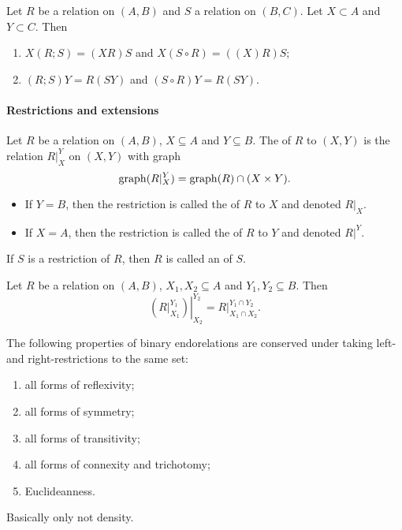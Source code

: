 \begin{lemma}
Let $R$ be a relation on $(A, B)$ and $S$ a relation on $(B, C)$. Let $X\subset A$ and $Y\subset C$. Then
\begin{enumerate}
\item $X(R;S) = (XR)S$ and $X(S\circ R) = ((X)R)S$;
\item $(R;S)Y = R(SY)$ and $(S\circ R)Y = R(SY)$.
\end{enumerate}
\end{lemma}

\paragraph{Restrictions and extensions}
\begin{definition}
Let $R$ be a relation on $(A, B)$, $X\subseteq A$ and $Y \subseteq B$. The  of $R$ to $(X,Y)$ is the relation $R|^Y_X$ on $(X,Y)$ with graph
\[ \operatorname{graph}(R|^Y_X) = \operatorname{graph}(R)\cap (X\times Y). \]
\begin{itemize}
\item If $Y = B$, then the restriction is called the  of $R$ to $X$ and denoted $\left.R\right|_X$.
\item If $X = A$, then the restriction is called the  of $R$ to $Y$ and denoted $\left.R\right|^Y$.
\end{itemize}
If $S$ is a restriction of $R$, then $R$ is called an  of $S$.
\end{definition}

\begin{lemma}
Let $R$ be a relation on $(A, B)$, $X_1,X_2\subseteq A$ and $Y_1,Y_2 \subseteq B$. Then
\[ \left.\left(R|_{X_1}^{Y_1}\right)\right|_{X_2}^{Y_2} = R|_{X_1\cap X_2}^{Y_1\cap Y_2}. \]
\end{lemma}

\begin{lemma} \label{lemma:relationPropertiesRestriction}
The following properties of binary endorelations are conserved under taking left- and right-restrictions to the same set:
\begin{enumerate}
\item all forms of reflexivity;
\item all forms of symmetry;
\item all forms of transitivity;
\item all forms of connexity and trichotomy;
\item Euclideanness.
\end{enumerate}
\end{lemma}
Basically only not density.

